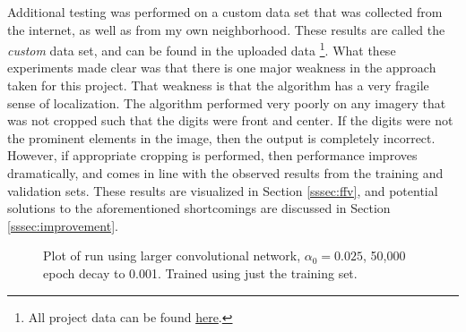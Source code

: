\documentclass[12pt]{article}
\begin{document}
Additional testing was performed on a custom data set that was collected from the internet, as well as from my own neighborhood.
These results are called the \textit{custom} data set, and can be found in the uploaded data \footnote{All project data can be found \href{https://drive.google.com/open?id=0B918sU9DDf8DTElNWGhwN1pTTXM}{here}.}.
What these experiments made clear was that there is one major weakness in the approach taken for this project.
That weakness is that the algorithm has a very fragile sense of localization.
The algorithm performed very poorly on any imagery that was not cropped such that the digits were front and center.
If the digits were not the prominent elements in the image, then the output is completely incorrect.
However, if appropriate cropping is performed, then performance improves dramatically, and comes in line with the observed results from the training and validation sets.
These results are visualized in Section \ref{sssec:ffv}, and potential solutions to the aforementioned shortcomings are discussed in Section \ref{sssec:improvement}.

\begin{figure}
\centering
{}\hfill
{}\hfill
\caption{Plot of run using larger convolutional network, $\alpha_0 = 0.025$, 50,000 epoch decay to 0.001. Trained using just the training set.}
\label{fig:final_lessdata}
\end{figure}
\end{document}
